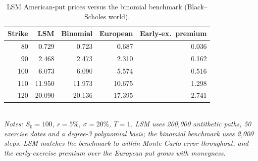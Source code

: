 \begin{table}[t]
\centering
\caption{LSM American-put prices versus the binomial benchmark (Black--Scholes world).}
\label{tab:lsm}
\small
\begin{tabular}{rrrrr}
\toprule
Strike & LSM & Binomial & European & Early-ex.\ premium \\
\midrule
80 & 0.729 & 0.723 & 0.687 & 0.036 \\
90 & 2.468 & 2.473 & 2.310 & 0.162 \\
100 & 6.073 & 6.090 & 5.574 & 0.516 \\
110 & 11.950 & 11.973 & 10.675 & 1.298 \\
120 & 20.090 & 20.136 & 17.395 & 2.741 \\
\bottomrule
\end{tabular}
\\[2pt]{\footnotesize\itshape Notes: $S_0=100$, $r=5\%$, $\sigma=20\%$, $T=1$. LSM uses 200{,}000 antithetic paths, 50 exercise dates and a degree-3 polynomial basis; the binomial benchmark uses 2{,}000 steps. LSM matches the benchmark to within Monte Carlo error throughout, and the early-exercise premium over the European put grows with moneyness.}
\end{table}